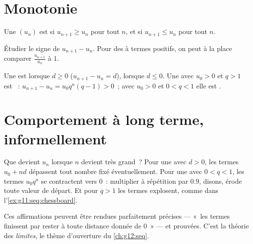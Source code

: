 \section{Monotonie}

\begin{definition}\label{def:g11:seq:monotone}
Une  $(u_n)$ est \emph{} si $u_{n+1} \geq u_n$ pour tout
$n$, et \emph{} si $u_{n+1} \leq u_n$ pour tout $n$.
\end{definition}

\begin{method}\label{met:g11:seq:monotonicity}
Étudier le signe de $u_{n+1} - u_n$. Pour des  à termes positifs,
on peut à la place comparer $\frac{u_{n+1}}{u_n}$ à $1$.
\end{method}

\begin{example}
Une  est  lorsque $d \geq 0$
($u_{n+1} - u_n = d$),  lorsque $d \leq 0$. Une  avec $u_0 > 0$ et $q > 1$ est ~:
$u_{n+1} - u_n = u_0 q^n (q - 1) > 0$~; avec $u_0 > 0$ et $0 < q < 1$
elle est .
\end{example}

\section{Comportement à long terme, informellement}

Que devient $u_n$ lorsque $n$ devient très grand~? Pour une  avec $d > 0$, les termes $u_0 + nd$ dépassent tout nombre
fixé éventuellement. Pour une  avec $0 < q < 1$, les
termes $u_0 q^n$ se contractent vers $0$~: multiplier à répétition par
$0.9$, disons, érode toute valeur de départ. Et pour $q > 1$ les termes
explosent, comme dans l'\cref{ex:g11:seq:chessboard}.

\begin{remark}
Ces affirmations peuvent être rendues parfaitement précises --- «~les
termes finissent par rester à toute distance donnée de $0$~» --- et
prouvées. C'est la théorie des \emph{limites}, le thème d'ouverture du
\cref{ch:g12:seq}.
\end{remark}

